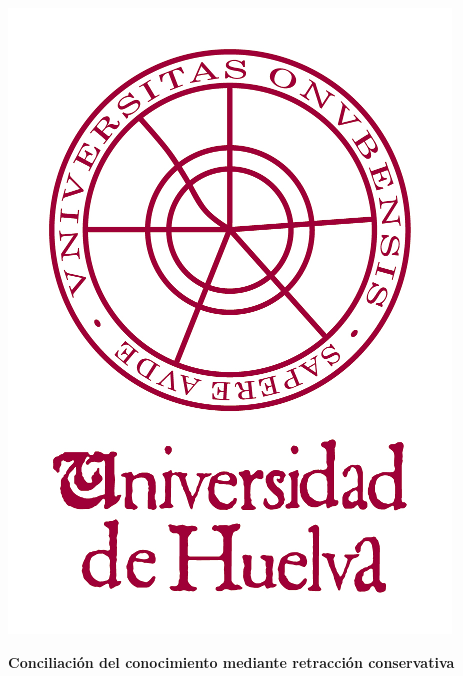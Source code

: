 \thispagestyle{empty}
\begin{center}
\includegraphics[scale=0.4]{./00_Titulo/figs/logoUHU}
\end{center}
\vspace*{0cm}
\Large 
%

\vspace{2cm}

\LARGE

\begin{center}
{\bf  Conciliación del conocimiento mediante retracción conservativa}
\end{center} 

\Large





